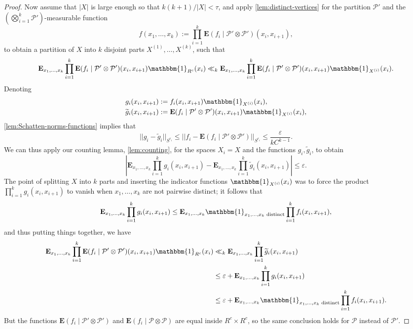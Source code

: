 \documentclass[reqno,11pt]{amsart}
\theoremstyle{definition}
\theoremstyle{remark}
\numberwithin{equation}{section}
\newcommand{\E}{\mathbf{E}}
\newcommand{\mP}{\mathcal{P}}
\newcommand{\one}{\mathbbm{1}}
\newcommand{\eps}{\varepsilon}
\renewcommand{\tilde}{\widetilde}
\begin{document}
\begin{proof}
Now assume that $|X|$ is large enough so that $k(k+1)/|X| < \tau$, and apply \cref{lem:distinct-vertices} for the partition $\mP'$ and the $(\bigotimes_{i=1}^k \mP')$-measurable function 
\[
    f(x_1,\ldots,x_k) := \prod_{i=1}^k\E(f_{i} \mid \mP' \otimes \mP')(x_i, x_{i+1}),
\]
to obtain a partition of $X$ into $k$ disjoint parts $X^{(1)}, \ldots, X^{(k)}$, such that
\[
    \E_{x_1,\ldots,x_k} \prod_{i=1}^k \E(f_{i} \mid \mP' \otimes \mP')(x_i, x_{i+1}) \one_{R^c}(x_i) \ll_k 
    \E_{x_1,\ldots,x_k} \prod_{i=1}^k
    \E(f_{i} \mid \mP' \otimes \mP')(x_i, x_{i+1}) \one_{X^{(i)}}(x_i).
\]
Denoting
\[
\begin{aligned}
    g_{i}(x_i, x_{i+1}) &:= f_{i}(x_i,x_{i+1}) \one_{X^{(i)}}(x_i), \\
    \tilde{g}_{i}(x_i, x_{i+1}) &:= \E(f_{i} \mid \mP' \otimes \mP')(x_i,x_{i+1}) \one_{X^{(i)}}(x_i),
\end{aligned} 
\]
\cref{lem:Schatten-norms-functions} implies that
\[
    ||g_{i} - \tilde{g}_{i}||_{S^{r_i}} \le ||f_{i} - \E(f_{i} \mid \mP' \otimes \mP')||_{S^{r_i}} \le \frac{\eps}{kC^{k-1}}.
\]
We can thus apply our counting lemma, \cref{lem:counting}, for the spaces $X_i = X$ and the functions $g_{i}, \tilde{g}_{i}$, to obtain
\[
    \left\vert \E_{x_1,\ldots,x_k} \prod_{i=1}^k g_{i}(x_i,x_{i+1}) - \E_{x_1,\ldots,x_k} \prod_{i=1}^k \tilde{g}_{i}(x_i,x_{i+1})\right\vert \le \eps.
\]
The point of splitting $X$ into $k$ parts and inserting the indicator functions $\one_{X^{(i)}}(x_i)$ was to force the product $\prod_{i=1}^k g_{i}(x_i,x_{i+1})$ to vanish when $x_1, \ldots, x_k$ are not pairwise distinct; it follows that 
\[
    \E_{x_1,\ldots,x_k} \prod_{i=1}^k g_{i}(x_i,x_{i+1}) \le 
    \E_{x_1, \ldots, x_k} \one_{x_1,\ldots,x_k \text{ distinct}}\prod_{i=1}^k f_{i}(x_i,x_{i+1}),
\]
and thus putting things together, we have
\[
\begin{aligned}
    \E_{x_1,\ldots,x_k} \prod_{i=1}^k \E(f_{i} \mid \mP' \otimes \mP')(x_i, x_{i+1}) \one_{R^c}(x_i) 
    &\ll_k
    \E_{x_1,\ldots,x_k} \prod_{i=1}^k
    \tilde{g}_{i}(x_i, x_{i+1}) 
    \\
    &\le
    \eps +
    \E_{x_1,\ldots,x_k} \prod_{i=1}^k
    g_{i}(x_i, x_{i+1}) 
    \\
    &\le
    \eps + \E_{x_1, \ldots, x_k} \one_{x_1,\ldots,x_k \textnormal{ distinct}}\prod_{i=1}^k f_{i}(x_i,x_{i+1}).
\end{aligned}
\]
But the functions $\E(f_{i} \mid \mP' \otimes \mP')$ and $\E(f_{i} \mid \mP \otimes \mP)$ are equal inside $R^c \times R^c$, so the same conclusion holds for $\mP$ instead of $\mP'$.
\end{proof}
\end{document}
